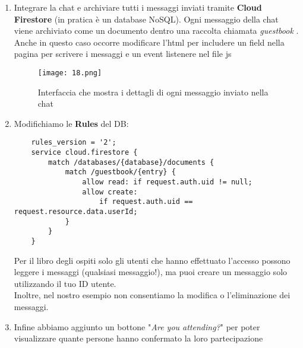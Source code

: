 \begin{enumerate}
    \item Integrare la chat e archiviare tutti i messaggi inviati tramite \textbf{Cloud Firestore} (in pratica è un database NoSQL).  Ogni messaggio della chat viene archiviato come un documento dentro una raccolta chiamata \textit{guestbook} . Anche in questo caso occorre modificare l'html per includere un field nella pagina per scrivere i messaggi e un event listenere nel file js
    \begin{figure}[h!]
    \centering
    \texttt{[image: 18.png]}
    \caption{Interfaccia che mostra i dettagli di ogni messaggio inviato nella chat}
\end{figure}

    \item Modifichiamo le \textbf{Rules} del DB:
    \begin{lstlisting}
    rules_version = '2';
    service cloud.firestore {
        match /databases/{database}/documents {
            match /guestbook/{entry} {
                allow read: if request.auth.uid != null;
                allow create:
                    if request.auth.uid == request.resource.data.userId;
            }
        }
    }
    \end{lstlisting}
    Per il libro degli ospiti solo gli utenti che hanno effettuato l'accesso possono leggere i messaggi (qualsiasi messaggio!), ma puoi creare un messaggio solo utilizzando il tuo ID utente.\\
    Inoltre, nel nostro esempio non consentiamo la modifica o l'eliminazione dei messaggi.

    \item Infine abbiamo aggiunto un bottone "\textit{Are you attending?}" per poter visualizzare quante persone hanno confermato la loro partecipazione
\end{enumerate}